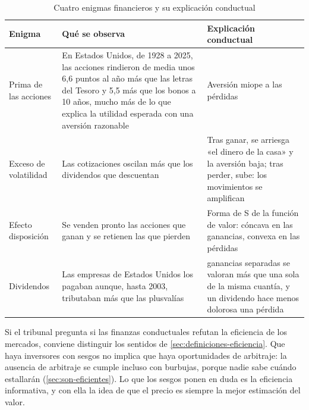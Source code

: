 \documentclass[11pt]{article}
\begin{document}
\begin{table}[H]
\centering
\caption{Cuatro enigmas financieros y su explicación conductual}\label{tab:enigmas}
\small
\begin{tabular}{>{\raggedright\arraybackslash}m{2.8cm}>{\raggedright\arraybackslash}m{6.0cm}>{\raggedright\arraybackslash}m{5.4cm}}
\toprule
\rowcolor{tceeazulpalido}\textbf{Enigma} & \textbf{Qué se observa} & \textbf{Explicación conductual}\\
\midrule
\cellcolor{tceesalvia}Prima de las acciones & \cellcolor{tceesalvia}En Estados Unidos, de 1928 a 2025, las acciones rindieron de media unos 6,6 puntos al año más que las letras del Tesoro y 5,5 más que los bonos a 10 años\nocite{Damodaran2026Historical}, mucho más de lo que explica la utilidad esperada con una aversión razonable\nocite{MehraPrescott1985Equity} & \cellcolor{tceesalvia}Aversión miope a las pérdidas\nocite{BenartziThaler1995Myopic}\\
\addlinespace[0.2em]
Exceso de volatilidad & Las cotizaciones oscilan más que los dividendos que descuentan\nocite{Shiller1981Move} & Tras ganar, se arriesga «el dinero de la casa» y la aversión baja; tras perder, sube\nocite{ThalerJohnson1990}: los movimientos se amplifican\\
\addlinespace[0.2em]
Efecto disposición & Se venden pronto las acciones que ganan y se retienen las que pierden\nocite{ShefrinStatman1985} & Forma de S de la función de valor: cóncava en las ganancias, convexa en las pérdidas\\
\addlinespace[0.2em]
Dividendos & Las empresas de Estados Unidos los pagaban aunque, hasta 2003, tributaban más que las plusvalías\nocite{IRS2026Topic404} & 2 ganancias separadas se valoran más que una sola de la misma cuantía, y un dividendo hace menos dolorosa una pérdida\nocite{ShefrinStatman1984}\\
\bottomrule
\end{tabular}
\end{table}

\begin{notaopositor}
Si el tribunal pregunta si las finanzas conductuales refutan la eficiencia de los mercados, conviene distinguir los sentidos de \ref{sec:definiciones-eficiencia}. Que haya inversores con sesgos no implica que haya oportunidades de arbitraje: la ausencia de arbitraje se cumple incluso con burbujas, porque nadie sabe cuándo estallarán (\ref{sec:son-eficientes}). Lo que los sesgos ponen en duda es la eficiencia informativa, y con ella la idea de que el precio es siempre la mejor estimación del valor.
\end{notaopositor}
\end{document}

